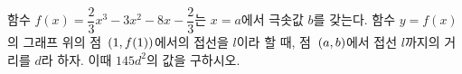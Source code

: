 함수 $f(x)=\dfrac{2}{3}x^3-3x^2-8x-\dfrac{2}{3}$는 $x=a$에서 극솟값 $b$를 갖는다. 함수 $y=f(x)$의 그래프 위의 점~$(1{,}\mkern3mu\mathopen{}f(1))$에서의 접선을 $l$이라 할 때, 점~$(a{,}\mkern3mu\mathopen{}b)$에서 접선 $l$까지의 거리를 $d$라 하자. 이때 $145d^2$의 값을 구하시오.
